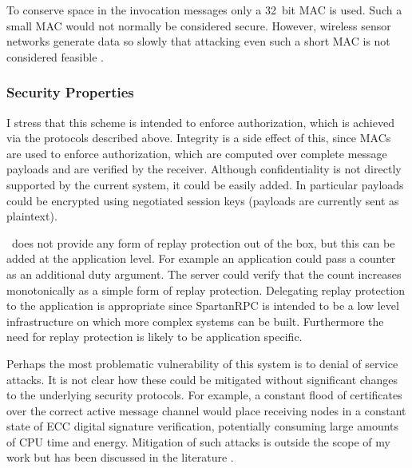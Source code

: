 To conserve space in the invocation messages only a 32~bit MAC is used. Such a small MAC would
not normally be considered secure. However, wireless sensor networks generate data so slowly
that attacking even such a short MAC is not considered feasible
\cite{karlog-tinysec-2004,luk-minisec-2007}.


\subsubsection{Security Properties}
\label{section-security-properties}

I stress that this scheme is intended to enforce authorization, which is achieved via the
protocols described above. Integrity is a side effect of this, since MACs are used to enforce
authorization, which are computed over complete message payloads and are verified by the
receiver. Although confidentiality is not directly supported by the current system, it could be
easily added. In particular payloads could be encrypted using negotiated session keys (payloads
are currently sent as plaintext).

\Sprocket\ does not provide any form of replay protection out of the box, but this can be added
at the application level. For example an application could pass a counter as an additional duty
argument. The server could verify that the count increases monotonically as a simple form of
replay protection. Delegating replay protection to the application is appropriate since
SpartanRPC is intended to be a low level infrastructure on which more complex systems can be
built. Furthermore the need for replay protection is likely to be application specific.

Perhaps the most problematic vulnerability of this system is to denial of service attacks. It is
not clear how these could be mitigated without significant changes to the underlying security
protocols. For example, a constant flood of certificates over the correct active message channel
would place receiving nodes in a constant state of ECC digital signature verification,
potentially consuming large amounts of CPU time and energy. Mitigation of such attacks is
outside the scope of my work but has been discussed in the literature \cite{4431860}.


